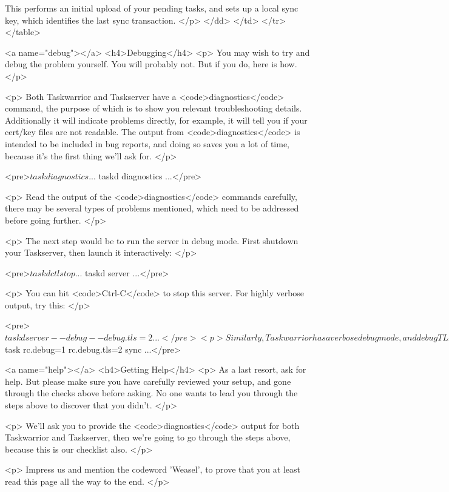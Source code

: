 \documentclass[t,handout]{beamer}
\begin{document}
          This performs an initial upload of your pending tasks, and
          sets up a local sync key, which identifies the last sync
          transaction.
        </p>
      </đd>
    </td>
  </tr>
</table>

<a name="debug"></a>
<h4>Debugging</h4>
<p>
  You may wish to try and debug the problem yourself. You will
  probably not. But if you do, here is how.
</p>

<p>
  Both Taskwarrior and Taskserver have a <code>diagnostics</code>
  command, the purpose of which is to show you relevant
  troubleshooting details. Additionally it will indicate problems
  directly, for example, it will tell you if your cert/key files
  are not readable. The output from <code>diagnostics</code> is
  intended to be included in bug reports, and doing so saves you
  a lot of time, because it's the first thing we'll ask for.
</p>

<pre>$ task diagnostics
...
$ taskd diagnostics
...</pre>

<p>
  Read the output of the <code>diagnostics</code> commands carefully,
  there may be several types of problems mentioned, which need to be
  addressed before going further.
</p>

<p>
  The next step would be to run the server in debug mode. First
  shutdown your Taskserver, then launch it interactively:
</p>

<pre>$ taskdctl stop
...
$ taskd server
...</pre>

<p>
  You can hit <code>Ctrl-C</code> to stop this server. For highly
  verbose output, try this:
</p>

<pre>$ taskd server --debug --debug.tls=2
...</pre>

<p>
  Similarly, Taskwarrior has a verbose debug mode, and debug TLS
  mode:
</p>

<pre>$ task rc.debug=1 rc.debug.tls=2 sync
...</pre>

<a name="help"></a>
<h4>Getting Help</h4>
<p>
  As a last resort, ask for help. But please make sure you have
  carefully reviewed your setup, and gone through the checks above
  before asking. No one wants to lead you through the steps above
  to discover that you didn't.
</p>

<p>
  We'll ask you to provide the <code>diagnostics</code> output
  for both Taskwarrior and Taskserver, then we're going to go
  through the steps above, because this is our checklist also.
</p>

<p>
  Impress us and mention the codeword 'Weasel', to prove that you
  at least read this page all the way to the end.
</p>
\end{document}
